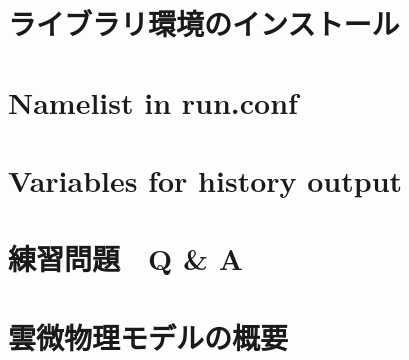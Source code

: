 \documentclass[a4paper]{jreport}
\begin{document}



\begin{appendix}

\chapter{ライブラリ環境のインストール} \label{achap:env_setting}

\chapter{Namelist in run.conf} \label{achap:namelist}

\chapter{Variables for history output} \label{achap:histroy_item}

\chapter{練習問題　Q \& A} \label{achap:practice}


\chapter{雲微物理モデルの概要} \label{achap:overview_microphysics}

\end{appendix}

\ClearWallPaper

\end{document}
